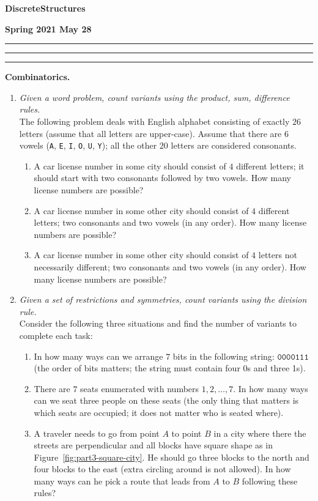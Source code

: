 \documentclass[a4paper,12pt]{article}
\begin{document}
\begin{center}
\parbox{3cm}{\flushleft\bf Discrete\linebreak Structures}
\hfill
\parbox{7cm}{}
\hfill
\parbox{3cm}{\flushright\bf Spring 2021 \linebreak May 28}
\end{center}

\hrule\vspace{2pt}\hrule

\hrule


\vspace{10pt}
{\bf Combinatorics.}

\begin{enumerate}
\item {\small \em Given a word problem, count variants using the product, sum, difference rules.}\\
The following problem deals with English alphabet consisting of exactly $26$ letters (assume that
all letters are upper-case). Assume that there are $6$ vowels ({\tt A}, {\tt E}, {\tt I}, {\tt O}, {\tt U}, {\tt Y});
all the other $20$ letters are considered consonants.
\begin{enumerate}
\item A car license number in some city should consist of $4$ different letters; it should start with
two consonants followed by two vowels. How many license numbers are possible?
\item A car license number in some other city should consist of $4$ different letters;
two consonants and two vowels (in any order). How many license numbers are possible?
\item A car license number in some other city should consist of $4$ letters \textendash{} not necessarily different;
two consonants and two vowels (in any order). How many license numbers are possible?
\end{enumerate}


\item {\small \em Given a set of restrictions and symmetries, count variants using the division rule.}\\
Consider the following three situations and find the number of variants to complete each task:
\begin{enumerate}
\item In how many ways can we arrange $7$ bits in the following string: $\mathtt{0000111}$ (the order of bits matters;
the string must contain four 0s and three 1s).
\item There are $7$ seats enumerated with numbers $1,2,\ldots,7$. In how many ways can we seat three people on these seats
(the only thing that matters is \textendash{} which seats are occupied; it does not matter who is seated where).
\item A traveler needs to go from point $A$ to point $B$ in a city where there the streets are perpendicular and
all blocks have square shape as in Figure~\ref{fig:part3-square-city}. He should go three blocks to the north and four blocks to the east (extra circling around is
not allowed). In how many ways can he pick a route that leads from $A$ to $B$ following these rules?


\end{enumerate}
\end{enumerate}
\end{document}
